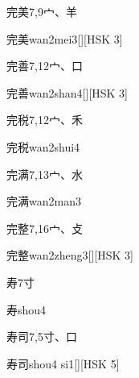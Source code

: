 \begin{entry}{完美}{7,9}{⼧、⽺}
  \begin{phonetics}{完美}{wan2mei3}[][HSK 3]
  \end{phonetics}
\end{entry}

\begin{entry}{完善}{7,12}{⼧、⼝}
  \begin{phonetics}{完善}{wan2shan4}[][HSK 3]
  \end{phonetics}
\end{entry}

\begin{entry}{完税}{7,12}{⼧、⽲}
  \begin{phonetics}{完税}{wan2shui4}
  \end{phonetics}
\end{entry}

\begin{entry}{完满}{7,13}{⼧、⽔}
  \begin{phonetics}{完满}{wan2man3}
  \end{phonetics}
\end{entry}

\begin{entry}{完整}{7,16}{⼧、⽁}
  \begin{phonetics}{完整}{wan2zheng3}[][HSK 3]
  \end{phonetics}
\end{entry}

\begin{entry}{寿}{7}{⼨}
  \begin{phonetics}{寿}{shou4}
  \end{phonetics}
\end{entry}

\begin{entry}{寿司}{7,5}{⼨、⼝}
  \begin{phonetics}{寿司}{shou4 si1}[][HSK 5]
  \end{phonetics}
\end{entry}

